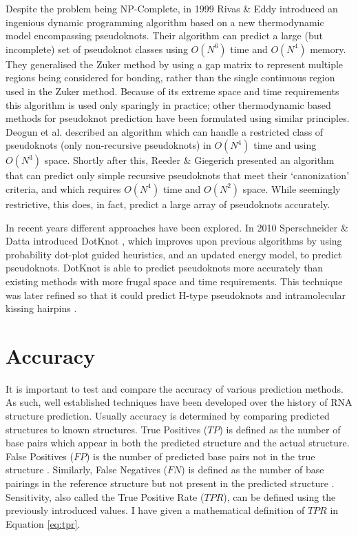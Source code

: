 \documentclass{cshonours}
\begin{document}
Despite the problem being NP-Complete, in 1999 Rivas \& Eddy \cite{rivas1999dynamic} introduced an ingenious dynamic
programming algorithm based on a new thermodynamic model encompassing pseudoknots. Their algorithm can predict a large (but incomplete) set of pseudoknot classes using
$O(N^6)$ time and $O(N^4)$ memory. They generalised the Zuker method by using a gap matrix to represent multiple regions being considered for bonding, rather than
the single continuous region used in the Zuker method. Because of its extreme
space and time requirements this algorithm is used only sparingly in practice; other thermodynamic based methods for pseudoknot prediction have
been formulated using similar principles. Deogun et al. \cite{deogun2004rna} described an algorithm which can handle a restricted class of pseudoknots (only non-recursive pseudoknots) in $O(N^4)$ time and using $O(N^3)$ space. Shortly after this, Reeder \& Giegerich \cite{reeder2004design} presented an algorithm that can predict
only simple recursive pseudoknots that meet their `canonization' criteria, and which requires $O(N^4)$ time and $O(N^2)$ space. While
seemingly restrictive, this does, in fact, predict a large array of pseudoknots accurately. 

In recent years different approaches have been explored. In 2010 Sperschneider \& Datta introduced DotKnot \cite{sperschneider2010dotknot}, which improves upon previous algorithms by using probability dot-plot guided heuristics, and an updated energy model, to predict pseudoknots. DotKnot is able to predict pseudoknots more accurately than existing methods with more frugal space and time requirements. This technique was later refined so that it could predict H-type pseudoknots and intramolecular kissing hairpins \cite{sperschneider2011heuristic}.


\section{Accuracy}
\label{sec:accuracy}
It is important to test and compare the accuracy of various prediction methods.
As such, well established techniques have been developed over
the history of RNA structure prediction. Usually accuracy is determined by comparing predicted structures to known
structures. True Positives ($TP$) is defined as the number of base pairs which appear in both the predicted structure and the actual structure. False Positives
($FP$) is the number of predicted base pairs not in the true
structure \cite{lorenz2011viennarna}. Similarly, False Negatives ($FN$) is defined as the number of base
pairings in the reference structure but not present in the predicted structure \cite{lorenz2011viennarna}.
Sensitivity, also called the True Positive Rate ($TPR$), can be defined using the previously introduced values. I have given a mathematical definition of $TPR$ in Equation \ref{eq:tpr}.
\end{document}
